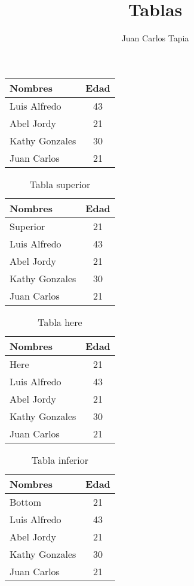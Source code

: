 \documentclass[11pt, a4paper]{article}
\author{Juan Carlos Tapia}
\title{Tablas}
\begin{document}
\maketitle
\begin{center}
\begin{tabular}{|l|c|}
\hline
Nombres & Edad \\ \hline
Luis Alfredo & 43 \\ \hline
Abel Jordy  & 21 \\ \hline
Kathy Gonzales & 30 \\ \hline
Juan Carlos & 21 \\ \hline
\end{tabular}
\end{center}




\begin{table}[t]
\begin{center}
\begin{tabular}{|l|c|}
\hline
Nombres & Edad \\ \hline
Superior & 21 \\ \hline
Luis Alfredo & 43 \\ \hline
Abel Jordy  & 21 \\ \hline
Kathy Gonzales & 30 \\ \hline
Juan Carlos & 21 \\ \hline
\end{tabular}
\caption{Tabla superior}
\end{center}
\end{table}

\begin{table}[h]
\begin{center}
\begin{tabular}{|l|c|}
\hline
Nombres & Edad \\ \hline
Here & 21 \\ \hline
Luis Alfredo & 43 \\ \hline
Abel Jordy  & 21 \\ \hline
Kathy Gonzales & 30 \\ \hline
Juan Carlos & 21 \\ \hline
\end{tabular}
\caption{Tabla here}
\end{center}
\end{table}


\begin{table}[b]
\begin{center}
\begin{tabular}{|l|c|}
\hline
Nombres & Edad \\ \hline
Bottom & 21 \\ \hline
Luis Alfredo & 43 \\ \hline
Abel Jordy  & 21 \\ \hline
Kathy Gonzales & 30 \\ \hline
Juan Carlos & 21 \\ \hline
\end{tabular}
\caption{Tabla inferior}
\end{center}
\end{table}
\end{document}
